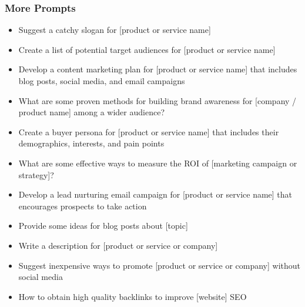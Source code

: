 \begin{frame}[fragile]\frametitle{More Prompts}
\begin{itemize}
\item Suggest a catchy slogan for [product or service name]
\item Create a list of potential target audiences for [product or service name]
\item Develop a content marketing plan for [product or service name] that includes blog posts, social media, and email campaigns
\item What are some proven methods for building brand awareness for [company / product name] among a wider audience?
\item Create a buyer persona for [product or service name] that includes their demographics, interests, and pain points
\item What are some effective ways to measure the ROI of [marketing campaign or strategy]?
\item Develop a lead nurturing email campaign for [product or service name] that encourages prospects to take action
\item Provide some ideas for blog posts about [topic]
\item Write a description for [product or service or company]
\item Suggest inexpensive ways to promote [product or service or company] without social media
\item How to obtain high quality backlinks to improve [website] SEO
\end{itemize}
\end{frame}